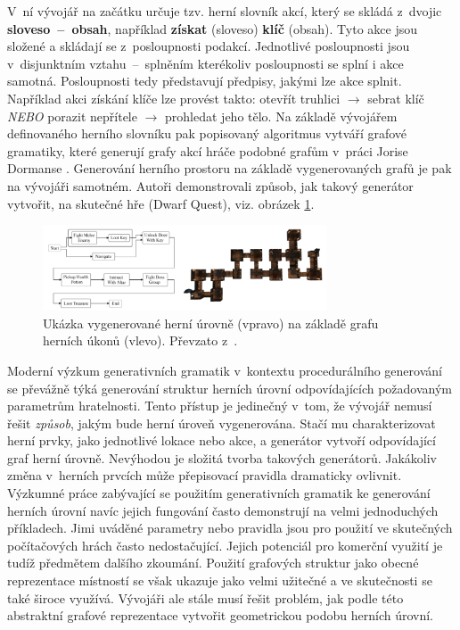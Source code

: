 V~ní vývojář na začátku určuje tzv. herní slovník akcí, který se skládá z~dvojic \textbf{sloveso~--~obsah}, například \textbf{získat} (sloveso) \textbf{klíč} (obsah).
Tyto akce jsou složené a skládají se z~posloupnosti podakcí.
Jednotlivé posloupnosti jsou v~disjunktním vztahu~--~splněním kterékoliv posloupnosti se splní i akce samotná.
Posloupnosti tedy představují předpisy, jakými lze akce splnit.
Například akci získání klíče lze provést takto: otevřít truhlici $\rightarrow$ sebrat klíč \textit{NEBO} porazit nepřítele $\rightarrow$ prohledat jeho tělo.
Na základě vývojářem definovaného herního slovníku pak popisovaný algoritmus vytváří grafové gramatiky, které generují grafy akcí hráče podobné grafům v~práci Jorise Dormanse \cite{lit:graph_dormans}.
Generování herního prostoru na základě vygenerovaných grafů je pak na vývojáři samotném.
Autoři demonstrovali způsob, jak takový generátor vytvořit, na skutečné hře (Dwarf Quest), viz. obrázek \ref{img:graph_der_linden}.
\begin{figure}[hbt]
    \centering
    \includegraphics[width=0.75\textwidth]{obrazky/graph_der_linden.png}
    \caption{Ukázka vygenerované herní úrovně (vpravo)
    na základě grafu herních úkonů (vlevo). Převzato z~\cite{lit:graph_der_linden}.}
    \label{img:graph_der_linden}
\end{figure}
\par
Moderní výzkum generativních gramatik v~kontextu procedurálního generování se převážně týká generování struktur herních úrovní odpovídajících požadovaným parametrům hratelnosti.
Tento přístup je jedinečný v~tom, že vývojář nemusí řešit \textit{způsob}, jakým bude herní úroveň vygenerována.
Stačí mu charakterizovat herní prvky, jako jednotlivé lokace nebo akce, a generátor vytvoří odpovídající graf herní úrovně.
Nevýhodou je složitá tvorba takových generátorů.
Jakákoliv změna v~herních prvcích může přepisovací pravidla dramaticky ovlivnit.
Výzkumné práce zabývající se použitím generativních gramatik ke generování herních úrovní navíc jejich fungování často demonstrují na velmi jednoduchých příkladech.
Jimi uváděné parametry nebo pravidla jsou pro použití ve skutečných počítačových hrách často nedostačující.
Jejich potenciál pro komerční využití je tudíž předmětem dalšího zkoumání.
Použití grafových struktur jako obecné reprezentace místností se však ukazuje jako velmi užitečné a ve skutečnosti se také široce využívá.
Vývojáři ale stále musí řešit problém, jak podle této abstraktní grafové reprezentace vytvořit geometrickou podobu herních úrovní.

